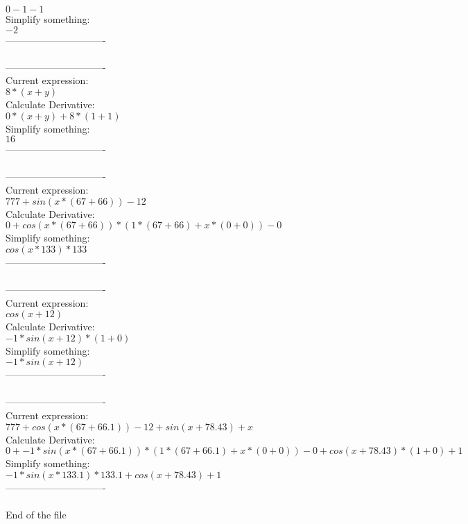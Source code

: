 \documentclass[12pt]{article}
\begin{document}
\( 0-1-1\) \\
Simplify something:\\
\( -2\) \\
-------------------------------\\
\\
-------------------------------\\
Current expression:\\
\( 8*(x+y)\) \\
Calculate Derivative:\\
\( 0*(x+y)+8*(1+1)\) \\
Simplify something:\\
\( 16\) \\
-------------------------------\\
\\
-------------------------------\\
Current expression:\\
\( 777+sin(x*(67+66))-12\) \\
Calculate Derivative:\\
\( 0+cos(x*(67+66))*(1*(67+66)+x*(0+0))-0\) \\
Simplify something:\\
\( cos(x*133)*133\) \\
-------------------------------\\
\\
-------------------------------\\
Current expression:\\
\( cos(x+12)\) \\
Calculate Derivative:\\
\( -1*sin(x+12)*(1+0)\) \\
Simplify something:\\
\( -1*sin(x+12)\) \\
-------------------------------\\
\\
-------------------------------\\
Current expression:\\
\( 777+cos(x*(67+66.1))-12+sin(x+78.43)+x\) \\
Calculate Derivative:\\
\( 0+-1*sin(x*(67+66.1))*(1*(67+66.1)+x*(0+0))-0+cos(x+78.43)*(1+0)+1\) \\
Simplify something:\\
\( -1*sin(x*133.1)*133.1+cos(x+78.43)+1\) \\
-------------------------------\\
\\

        End of the file
        
\end{document}
